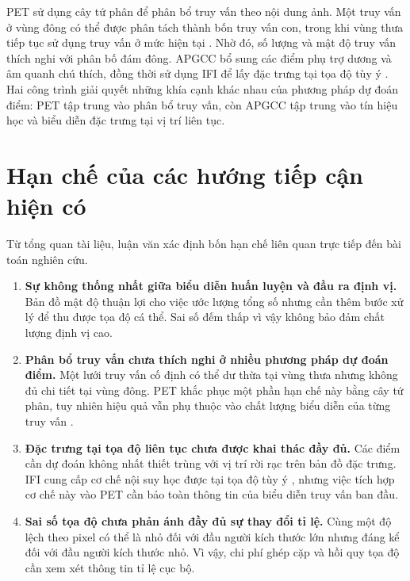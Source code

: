 PET sử dụng cây tứ phân để phân bổ truy vấn theo nội dung ảnh. Một truy vấn ở vùng đông có thể được phân tách thành bốn truy vấn con, trong khi vùng thưa tiếp tục sử dụng truy vấn ở mức hiện tại \cite{liu2023pet}. Nhờ đó, số lượng và mật độ truy vấn thích nghi với phân bố đám đông. APGCC bổ sung các điểm phụ trợ dương và âm quanh chú thích, đồng thời sử dụng IFI để lấy đặc trưng tại tọa độ tùy ý \cite{chen2024apgcc}. Hai công trình giải quyết những khía cạnh khác nhau của phương pháp dự đoán điểm: PET tập trung vào phân bổ truy vấn, còn APGCC tập trung vào tín hiệu học và biểu diễn đặc trưng tại vị trí liên tục.

\section{Hạn chế của các hướng tiếp cận hiện có}

Từ tổng quan tài liệu, luận văn xác định bốn hạn chế liên quan trực tiếp đến bài toán nghiên cứu.

\begin{enumerate}[label=\arabic*)]
    \item \textbf{Sự không thống nhất giữa biểu diễn huấn luyện và đầu ra định vị.} Bản đồ mật độ thuận lợi cho việc ước lượng tổng số nhưng cần thêm bước xử lý để thu được tọa độ cá thể. Sai số đếm thấp vì vậy không bảo đảm chất lượng định vị cao.

    \item \textbf{Phân bổ truy vấn chưa thích nghi ở nhiều phương pháp dự đoán điểm.} Một lưới truy vấn cố định có thể dư thừa tại vùng thưa nhưng không đủ chi tiết tại vùng đông. PET khắc phục một phần hạn chế này bằng cây tứ phân, tuy nhiên hiệu quả vẫn phụ thuộc vào chất lượng biểu diễn của từng truy vấn \cite{liu2023pet}.

    \item \textbf{Đặc trưng tại tọa độ liên tục chưa được khai thác đầy đủ.} Các điểm cần dự đoán không nhất thiết trùng với vị trí rời rạc trên bản đồ đặc trưng. IFI cung cấp cơ chế nội suy học được tại tọa độ tùy ý \cite{chen2024apgcc}, nhưng việc tích hợp cơ chế này vào PET cần bảo toàn thông tin của biểu diễn truy vấn ban đầu.

    \item \textbf{Sai số tọa độ chưa phản ánh đầy đủ sự thay đổi tỉ lệ.} Cùng một độ lệch theo pixel có thể là nhỏ đối với đầu người kích thước lớn nhưng đáng kể đối với đầu người kích thước nhỏ. Vì vậy, chi phí ghép cặp và hồi quy tọa độ cần xem xét thông tin tỉ lệ cục bộ.
\end{enumerate}

